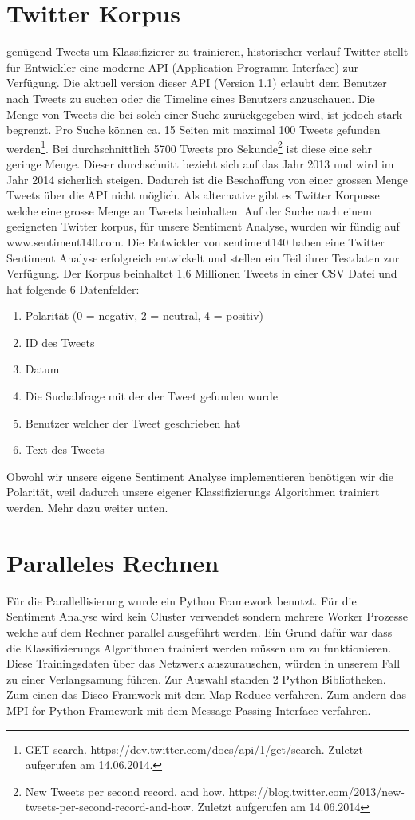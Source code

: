 \documentclass[12pt, oneside]{report}   	%
\begin{document}
\section{Twitter Korpus}
genügend Tweets um Klassifizierer zu trainieren, historischer verlauf
Twitter stellt für Entwickler eine moderne API (Application Programm Interface) zur Verfügung. Die aktuell version dieser API (Version 1.1) erlaubt dem Benutzer nach Tweets zu suchen oder die Timeline eines Benutzers anzuschauen. Die Menge von Tweets die bei solch einer Suche zurückgegeben wird, ist jedoch stark begrenzt. Pro Suche können ca. 15 Seiten mit maximal 100 Tweets gefunden werden\footnote{GET search. https://dev.twitter.com/docs/api/1/get/search. Zuletzt aufgerufen am 14.06.2014.}. Bei durchschnittlich 5700 Tweets pro Sekunde\footnote{New Tweets per second record, and how. https://blog.twitter.com/2013/new-tweets-per-second-record-and-how. Zuletzt aufgerufen am 14.06.2014} ist diese eine sehr geringe Menge. Dieser durchschnitt bezieht sich auf das Jahr 2013 und wird im Jahr 2014 sicherlich steigen.
Dadurch ist die Beschaffung von einer grossen Menge Tweets über die API nicht möglich. Als alternative gibt es Twitter Korpusse welche eine grosse Menge an Tweets beinhalten. 
\newline{}
Auf der Suche nach einem geeigneten Twitter korpus, für unsere Sentiment Analyse, wurden wir fündig auf www.sentiment140.com. Die Entwickler von sentiment140 haben eine Twitter Sentiment Analyse erfolgreich entwickelt und stellen ein Teil ihrer Testdaten zur Verfügung. Der Korpus beinhaltet 1,6 Millionen Tweets in einer CSV Datei und hat folgende 6 Datenfelder:
\begin{enumerate}
\item Polarität (0 = negativ, 2 = neutral, 4 = positiv)
\item ID des Tweets
\item Datum
\item Die Suchabfrage mit der der Tweet gefunden wurde
\item Benutzer welcher der Tweet geschrieben hat
\item Text des Tweets
\end{enumerate}
Obwohl wir unsere eigene Sentiment Analyse implementieren benötigen wir die Polarität, weil dadurch unsere eigener Klassifizierungs Algorithmen trainiert werden. Mehr dazu weiter unten. 

\section{Paralleles Rechnen}
Für die Parallellisierung wurde ein Python Framework benutzt. Für die Sentiment Analyse wird kein Cluster verwendet sondern mehrere Worker Prozesse welche auf dem Rechner parallel ausgeführt werden. Ein Grund dafür war dass die Klassifizierungs Algorithmen trainiert werden müssen um zu funktionieren. Diese Trainingsdaten über das Netzwerk auszurauschen, würden in unserem Fall zu einer Verlangsamung führen. %
Zur Auswahl standen 2 Python Bibliotheken. Zum einen das Disco Framwork mit dem Map Reduce verfahren. Zum andern das  MPI for Python Framework mit dem Message Passing Interface verfahren.
\end{document}
